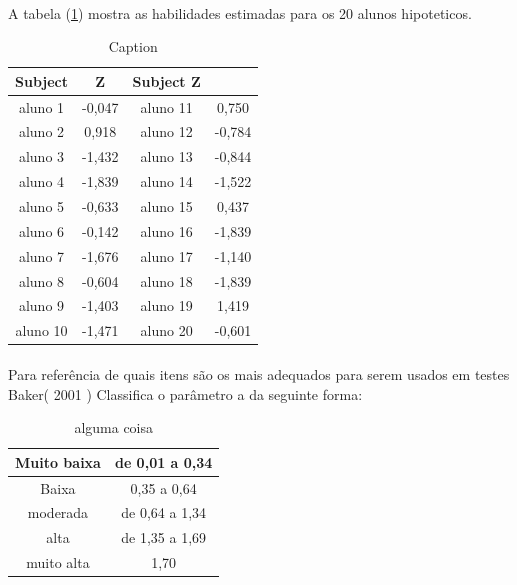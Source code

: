    \paragraph{}
       A tabela (\ref{tab:habilidadesafter}) mostra as habilidades estimadas para os 20 alunos hipoteticos.
    \begin{table}[!h]
        \centering
        \begin{tabular}{c|c|c|c}
            \hline
            Subject  &	Z	&	Subject	Z\\
            \hline
            \hline
            aluno 1  &	-0,047	&	aluno 11 &	0,750 \\
            \hline
            aluno 2  &	0,918	&	aluno 12 &	-0,784 \\
            \hline
            aluno 3  &	-1,432	&	aluno 13 &	-0,844 \\
            \hline
            aluno 4  &	-1,839	&	aluno 14 &	-1,522 \\
            \hline
            aluno 5  &	-0,633	&	aluno 15 &	0,437 \\
            \hline
            aluno 6  &	-0,142	&	aluno 16 &	-1,839 \\
            \hline
            aluno 7  &	-1,676	&	aluno 17 &	-1,140 \\
            \hline
            aluno 8  &	-0,604	&	aluno 18 &	-1,839 \\
            \hline
            aluno 9  &	-1,403	&	aluno 19 &	1,419 \\
            \hline
            aluno 10 &	-1,471	&	aluno 20 &	-0,601 \\
            \hline
        \end{tabular}
        \caption{Caption}
        \label{tab:habilidadesafter}
    \end{table}
	    
	\paragraph{}
	    Para referência de quais itens são os mais adequados para serem usados em testes Baker( 2001 ) Classifica o parâmetro a da seguinte forma: \\
	\begin{table}[!h]
	    \centering
	    \caption{alguma coisa}
    	\begin{tabular}{|c|c|}
    	    \hline
    	    Muito baixa & de 0,01 a 0,34\\
    	    \hline
    	    Baixa & 0,35 a 0,64\\
    	    \hline
    	    moderada & de 0,64 a 1,34\\
    	    \hline
    	    alta & de 1,35 a 1,69\\
    	    \hline
    	    muito alta & 1,70 \\
    	    \hline
    	\end{tabular}
	\end{table}
	

    \newpage